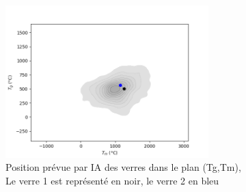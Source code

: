 \documentclass{article}
\begin{document}
\begin{figure}[ht]
    \centering
    \includegraphics[width=0.7\textwidth]{photos/Tg Tm.png}
    \caption{Position prévue par IA des verres dans le plan (Tg,Tm),\\ Le verre 1 est représenté en noir, le verre 2 en bleu}
\end{figure}

\clearpage	
\printbibliography
\end{document}
